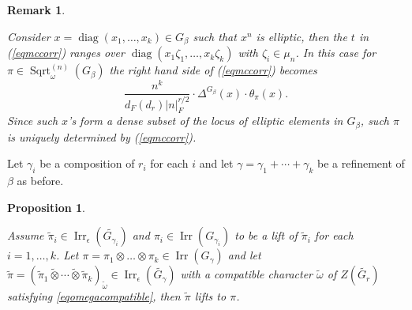 \documentclass{amsart}
\numberwithin{equation}{section}
\newtheorem{proposition}[theorem]{\bf{Proposition}}
\newtheorem{remark}[theorem]{\bf{Remark}}
\newcommand{\abs}[1]{\left|#1\right|_{F}}
\newcommand{\mrdiag}{\operatorname{diag}}
\newcommand{\mrirr}{\operatorname{Irr}}
\newcommand{\mrsqrt}{\operatorname{Sqrt}}
\newcommand{\dF}[1]{d_{F}(#1)}
\newcommand{\wt}[1]{\widetilde{#1}}
\begin{document}
	\begin{remark}\label{remTrpisupp}
		
		Consider $x=\mrdiag(x_{1},\dots,x_{k})\in G_{\beta}$ such that $x^{n}$ is elliptic, then the $t$ in (\ref{eqmccorr}) ranges over $\mrdiag(x_{1}\zeta_{1},\dots,x_{k}\zeta_{k})$ with $\zeta_{i}\in\mu_{n}$. In this case for $\pi\in\mrsqrt^{(n)}_{\omega}(G_{\beta})$ the right hand side of (\ref{eqmccorr}) becomes $$\frac{n^{k}}{\dF{d_{r}}\abs{n}^{r/2}}\cdot \Delta^{G_{\beta}}(x)\cdot\theta_{\pi}(x).$$
		Since such $x$'s form a dense subset of the locus of elliptic elements in $G_{\beta}$, such $\pi$ is uniquely determined by (\ref{eqmccorr}).
		
		
	\end{remark}
	
	Let $\gamma_{i}$ be a composition of $r_{i}$ for each $i$ and let $\gamma=\gamma_{1}+\cdots+\gamma_{k}$ be a refinement of $\beta$ as before.
	
	\begin{proposition}\label{propmcMTPcomp}
		
		Assume $\wt{\pi}_{i}\in\mrirr_{\epsilon}(\wt{G_{\gamma_{i}}})$ and $\pi_{i}\in\mrirr(G_{\gamma_{i}})$ to be a lift of $\wt{\pi}_{i}$ for each $i=1,\dots,k$. Let $\pi=\pi_{1}\otimes\dots\otimes\pi_{k}\in\mrirr(G_{\gamma})$ and let $\wt{\pi}=(\wt{\pi}_{1}\wt{\otimes}\cdots\wt{\otimes}\wt{\pi}_{k})_{\wt{\omega}}\in\mrirr_{\epsilon}(\wt{G_{\gamma}})$ with a compatible character $\wt{\omega}$ of $Z(\wt{G_{r}})$ satisfying \eqref{eqomegacompatible}, then $\wt{\pi}$ lifts to $\pi$. 
		
	\end{proposition}
	
\end{document}
